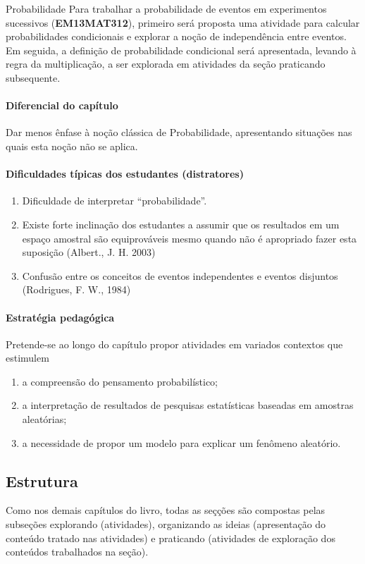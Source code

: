 \begin{apresentacao}{Probabilidade}
Para trabalhar a probabilidade de eventos em experimentos sucessivos (\textbf{EM13MAT312}), primeiro será proposta uma atividade para calcular probabilidades condicionais e explorar a noção de independência entre eventos. Em seguida, a definição de probabilidade condicional será apresentada, levando à regra da multiplicação, a ser explorada em atividades da seção praticando subsequente.

\paragraph{Diferencial do capítulo}
Dar menos ênfase à noção clássica de Probabilidade, apresentando situações nas quais esta noção não se aplica.

\paragraph{Dificuldades típicas dos estudantes (distratores)}
\begin{enumerate}
\item Dificuldade de interpretar “probabilidade”.
\item Existe forte inclinação dos estudantes a assumir que os resultados em um espaço amostral são equiprováveis mesmo quando não é apropriado fazer esta suposição (Albert., J. H. 2003)
\item Confusão entre os conceitos de eventos independentes e eventos disjuntos (Rodrigues, F. W., 1984)
\end{enumerate}

\paragraph{Estratégia pedagógica}
Pretende-se ao longo do capítulo propor atividades em variados contextos que estimulem

\begin{enumerate}
\item a compreensão do pensamento probabilístico;
\item a interpretação de resultados de pesquisas estatísticas baseadas em amostras aleatórias;
\item a necessidade de propor um modelo para explicar um fenômeno aleatório.
\end{enumerate}

\subsection{Estrutura}
Como nos demais capítulos do livro, todas as seçções são compostas pelas subseções explorando (atividades), organizando as ideias (apresentação do conteúdo tratado nas atividades) e praticando (atividades de exploração dos conteúdos trabalhados na seção).


\end{apresentacao}
